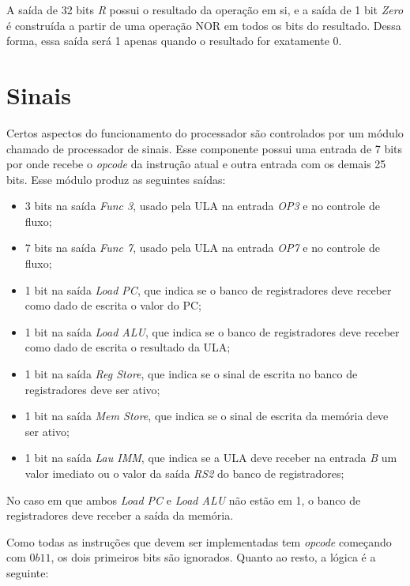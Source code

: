 \documentclass[twocolumn]{article}
\newcommand{\circuit}[1]{}
\begin{document}
A saída de 32 bits \textit{R} possui o resultado da operação em si, e a saída de
1 bit \textit{Zero} é construída a partir de uma operação NOR em todos os bits
do resultado. Dessa forma, essa saída será 1 apenas quando o resultado for
exatamente 0.

\section{Sinais}

Certos aspectos do funcionamento do processador são controlados por um módulo
chamado de processador de sinais. Esse componente possui uma entrada de 7 bits
por onde recebe o \textit{opcode} da instrução atual e outra entrada com os
demais 25 bits. Esse módulo produz as seguintes saídas:

\circuit{signal-proc}

\begin{itemize}
\item 3 bits na saída \textit{Func 3}, usado pela ULA na entrada \textit{OP3} e
  no controle de fluxo;
\item 7 bits na saída \textit{Func 7}, usado pela ULA na entrada \textit{OP7} e
  no controle de fluxo;
\item 1 bit na saída \textit{Load PC}, que indica se o banco de registradores
  deve receber como dado de escrita o valor do PC;
\item 1 bit na saída \textit{Load ALU}, que indica se o banco de registradores
  deve receber como dado de escrita o resultado da ULA;
\item 1 bit na saída \textit{Reg Store}, que indica se o sinal de escrita no
  banco de registradores deve ser ativo;
\item 1 bit na saída \textit{Mem Store}, que indica se o sinal de escrita da
  memória deve ser ativo;
\item 1 bit na saída \textit{Lau IMM}, que indica se a ULA deve receber na
  entrada \textit{B} um valor imediato ou o valor da saída \textit{RS2} do banco
  de registradores;
\end{itemize}

No caso em que ambos \textit{Load PC} e \textit{Load ALU} não estão em 1, o
banco de registradores deve receber a saída da memória.

Como todas as instruções que devem ser implementadas tem \textit{opcode}
começando com $0b11$, os dois primeiros bits são ignorados. Quanto ao resto, a
lógica é a seguinte:
\end{document}
